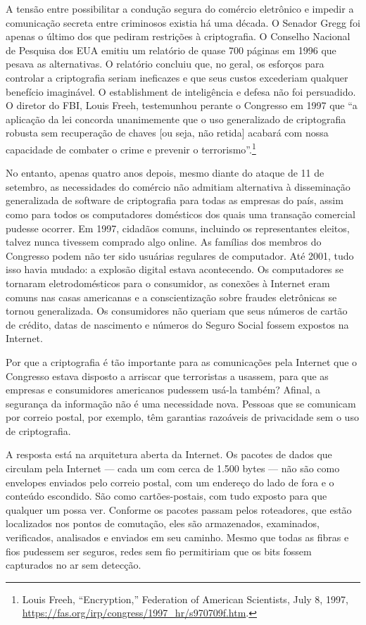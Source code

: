 \documentclass{book}
\begin{document}
A tensão entre possibilitar a condução segura do comércio eletrônico e impedir a comunicação secreta entre criminosos existia há uma década. O Senador Gregg foi apenas o último dos que pediram restrições à criptografia. O Conselho Nacional de Pesquisa dos EUA emitiu um relatório de quase 700 páginas em 1996 que pesava as alternativas. O relatório concluiu que, no geral, os esforços para controlar a criptografia seriam ineficazes e que seus custos excederiam qualquer benefício imaginável. O establishment de inteligência e defesa não foi persuadido. O diretor do FBI, Louis Freeh, testemunhou perante o Congresso em 1997 que ``a aplicação da lei concorda unanimemente que o uso generalizado de criptografia robusta sem recuperação de chaves [ou seja, não retida] acabará com nossa capacidade de combater o crime e prevenir o terrorismo''.\footnote{Louis Freeh, “Encryption,” Federation of American Scientists, July 8, 1997, \url{https://fas.org/irp/congress/1997_hr/s970709f.htm}.}

No entanto, apenas quatro anos depois, mesmo diante do ataque de 11 de setembro, as necessidades do comércio não admitiam alternativa à disseminação generalizada de software de criptografia para todas as empresas do país, assim como para todos os computadores domésticos dos quais uma transação comercial pudesse ocorrer. Em 1997, cidadãos comuns, incluindo os representantes eleitos, talvez nunca tivessem comprado algo online. As famílias dos membros do Congresso podem não ter sido usuárias regulares de computador. Até 2001, tudo isso havia mudado: a explosão digital estava acontecendo. Os computadores se tornaram eletrodomésticos para o consumidor, as conexões à Internet eram comuns nas casas americanas e a conscientização sobre fraudes eletrônicas se tornou generalizada. Os consumidores não queriam que seus números de cartão de crédito, datas de nascimento e números do Seguro Social fossem expostos na Internet.

Por que a criptografia é tão importante para as comunicações pela Internet que o Congresso estava disposto a arriscar que terroristas a usassem, para que as empresas e consumidores americanos pudessem usá-la também? Afinal, a segurança da informação não é uma necessidade nova. Pessoas que se comunicam por correio postal, por exemplo, têm garantias razoáveis de privacidade sem o uso de criptografia.

A resposta está na arquitetura aberta da Internet. Os pacotes de dados que circulam pela Internet --- cada um com cerca de 1.500 bytes --- não são como envelopes enviados pelo correio postal, com um endereço do lado de fora e o conteúdo escondido. São como cartões-postais, com tudo exposto para que qualquer um possa ver. Conforme os pacotes passam pelos roteadores, que estão localizados nos pontos de comutação, eles são armazenados, examinados, verificados, analisados e enviados em seu caminho. Mesmo que todas as fibras e fios pudessem ser seguros, redes sem fio permitiriam que os bits fossem capturados no ar sem detecção.
\end{document}
